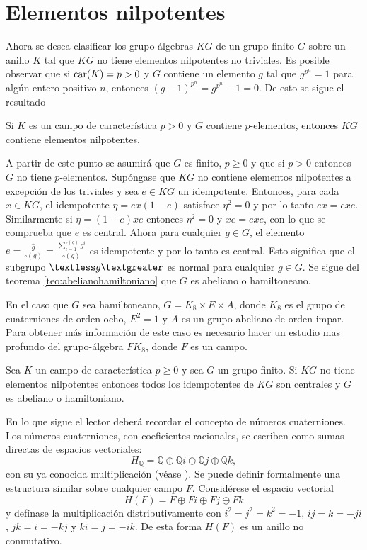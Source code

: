 \section{\quad Elementos nilpotentes}
Ahora se desea clasificar los grupo-álgebras $KG$ de un grupo finito $G$ sobre un anillo $K$ tal que $KG$ no tiene elementos nilpotentes no triviales. Es posible observar que si $\operatorname{car}(K) = p > 0$ y $G$ contiene un elemento $g$ tal que $g^{p^{n}} = 1$ para algún entero positivo $n$, entonces $(g - 1 )^{p^{n}} = g^{p^{n}} - 1 = 0$. De esto se sigue el resultado
\begin{proposicion}\label{prop:nilpotentes}
Si $K$ es un campo de característica $p > 0 $ y $G$ contiene $p$-elementos, entonces $KG$ contiene elementos nilpotentes.  
\end{proposicion}
A partir de este punto se asumirá que $G$ es finito, $p\geq 0$ y que si $p >0 $ entonces $G$ no tiene $p$-elementos. Supóngase que $KG$ no contiene elementos nilpotentes a excepción de los triviales y sea $e \in KG$ un idempotente. Entonces, para cada $x \in KG$, el idempotente $\eta = ex(1-e)$ satisface $\eta^2 = 0$ y por lo tanto $ ex = exe $. Similarmente si $\eta = (1 - e)xe$ entonces $\eta^2 = 0$ y $xe = exe$, con lo que se comprueba que $e$ es central. Ahora para cualquier $g \in G$, el elemento $e = \frac{\hat{g}}{\circ (g)} = \frac{\sum_{i = 1}^{\circ(g)}g^i}{\circ(g)}$ es idempotente y por lo tanto es central. Esto significa que el subgrupo $\textless g \textgreater$ es normal para cualquier $g \in G$. Se sigue del teorema \ref{teo:abelianohamiltoniano} que $G$ es abeliano o hamiltoneano. 

En el caso que $G$ sea hamiltoneano, $G = K_8 \times E \times A$, donde $K_8$ es el grupo de cuaterniones de orden ocho, $E^2 = 1$ y $A$ es un grupo abeliano de orden impar. Para obtener más información de este caso es necesario hacer un estudio mas profundo del grupo-álgebra $FK_8$, donde $F$ es un campo.

\begin{proposicion}\label{prop:AH}
Sea $K$ un campo de característica $p \geq 0$ y sea $G$ un grupo finito. Si $KG$ no tiene elementos nilpotentes entonces todos los idempotentes de $KG$ son centrales y $G$ es abeliano o hamiltoniano.
\end{proposicion}

En lo que sigue el lector deberá recordar el concepto de números cuaterniones. Los números cuaterniones, con coeficientes racionales, se escriben como sumas directas de espacios vectoriales:
\begin{equation*}
H_{\mathds{Q}} = \mathds{Q}\oplus\mathds{Q}i\oplus\mathds{Q}j\oplus\mathds{Q}k,
\end{equation*}
con su ya conocida multiplicación (véase \cite[p. 31]{bib:herstein}). Se puede definir formalmente una estructura similar sobre cualquier campo $F$. Considérese el espacio vectorial
\begin{equation*}
H(F) = F\oplus Fi\oplus Fj\oplus Fk 
\end{equation*} 
y defínase la multiplicación distributivamente con $i^2 = j^2 = k^2 = -1$, $ij = k = -ji$, $jk = i = -kj$ y $ki = j = -ik$. De esta forma $H(F)$ es un anillo no conmutativo.

